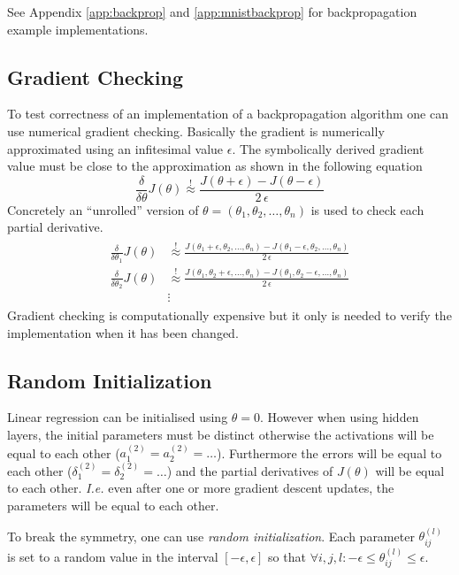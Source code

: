 \documentclass[a4paper,twoside,10pt]{article}
\begin{document}
See Appendix \ref{app:backprop} and \ref{app:mnistbackprop} for backpropagation example implementations.

\subsection{Gradient Checking}
To test correctness of an implementation of a backpropagation algorithm one can use numerical gradient checking.
Basically the gradient is numerically approximated using an infitesimal value $\epsilon$.
The symbolically derived gradient value must be close to the approximation as shown in the following equation
\begin{equation*}
\frac{\delta}{\delta\theta}J(\theta)\overset{!}{\approx}\frac{J(\theta+\epsilon)-J(\theta-\epsilon)}{2\,\epsilon}
\end{equation*}
Concretely an ``unrolled'' version of $\theta=(\theta_1,\theta_2,\ldots,\theta_n)$ is used to check each partial derivative.
\begin{align*}
  \begin{split}
    \frac{\delta}{\delta\theta_1}J(\theta)&\overset{!}{\approx}\frac{J(\theta_1+\epsilon,\theta_2,\ldots,\theta_n)-J(\theta_1-\epsilon,\theta_2,\ldots,\theta_n)}{2\,\epsilon}\\
    \frac{\delta}{\delta\theta_2}J(\theta)&\overset{!}{\approx}\frac{J(\theta_1,\theta_2+\epsilon,\ldots,\theta_n)-J(\theta_1,\theta_2-\epsilon,\ldots,\theta_n)}{2\,\epsilon}\\
                                          &\vdots
  \end{split}
\end{align*}
Gradient checking is computationally expensive but it only is needed to verify the implementation when it has been changed.

\subsection{Random Initialization}
Linear regression can be initialised using $\theta=0$.
However when using hidden layers, the initial parameters must be distinct otherwise the activations will be equal to each other ($a^{(2)}_1=a^{(2)}_2=\ldots$).
Furthermore the errors will be equal to each other ($\delta^{(2)}_1=\delta^{(2)}_2=\ldots$) and
the partial derivatives of $J(\theta)$ will be equal to each other.
\emph{I.e.} even after one or more gradient descent updates, the parameters will be equal to each other.

To break the symmetry, one can use \emph{random initialization}.
Each parameter $\theta^{(l)}_{ij}$ is set to a random value in the interval $[-\epsilon,\epsilon]$ so that $\forall i,j,l:-\epsilon\le\theta^{(l)}_{ij}\le\epsilon$.
\end{document}
